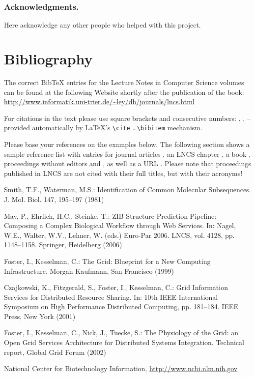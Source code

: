 \documentclass[runningheads]{llncs}
\begin{document}
\subsubsection*{Acknowledgments.} Here acknowledge any other people who helped with this project.

\section{Bibliography}\label{references}

The correct BibTeX entries for the Lecture Notes in Computer Science
volumes can be found at the following Website shortly after the
publication of the book:
\url{http://www.informatik.uni-trier.de/~ley/db/journals/lncs.html}

For citations in the text please use
square brackets and consecutive numbers: \cite{jour}, \cite{lncschap},
\cite{proceeding1} -- provided automatically
by \LaTeX 's \verb|\cite| \dots\verb|\bibitem| mechanism.

Please base your references on the
examples below. 
The following section shows a sample reference list with entries for
journal articles \cite{jour}, an LNCS chapter \cite{lncschap}, a book
\cite{book}, proceedings without editors \cite{proceeding1} and
\cite{proceeding2}, as well as a URL \cite{url}.
Please note that proceedings published in LNCS are not cited with their
full titles, but with their acronyms!

\begin{thebibliography}{4}

 Smith, T.F., Waterman, M.S.: Identification of Common Molecular
Subsequences. J. Mol. Biol. 147, 195--197 (1981)

 May, P., Ehrlich, H.C., Steinke, T.: ZIB Structure Prediction Pipeline:
Composing a Complex Biological Workflow through Web Services. In: Nagel,
W.E., Walter, W.V., Lehner, W. (eds.) Euro-Par 2006. LNCS, vol. 4128,
pp. 1148--1158. Springer, Heidelberg (2006)

 Foster, I., Kesselman, C.: The Grid: Blueprint for a New Computing
Infrastructure. Morgan Kaufmann, San Francisco (1999)

 Czajkowski, K., Fitzgerald, S., Foster, I., Kesselman, C.: Grid
Information Services for Distributed Resource Sharing. In: 10th IEEE
International Symposium on High Performance Distributed Computing, pp.
181--184. IEEE Press, New York (2001)

 Foster, I., Kesselman, C., Nick, J., Tuecke, S.: The Physiology of the
Grid: an Open Grid Services Architecture for Distributed Systems
Integration. Technical report, Global Grid Forum (2002)

 National Center for Biotechnology Information, \url{http://www.ncbi.nlm.nih.gov}

\end{thebibliography}
\end{document}
